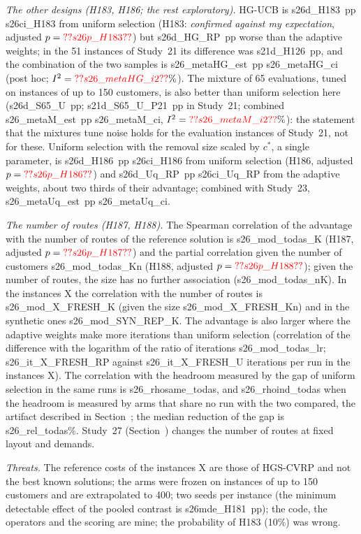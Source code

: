 \emph{The other designs (H183, H186; the rest exploratory).} HG-UCB is \num{s26d_H183}~pp \num{s26ci_H183} from uniform selection (H183: \emph{confirmed against my expectation}, adjusted $p=\num{s26p_H183}$) but \num{s26d_HG_RP}~pp worse than the adaptive weights; in the 51 instances of Study~21 its difference was \num{s21d_H126}~pp, and the combination of the two samples is \num{s26_metaHG_est}~pp \num{s26_metaHG_ci} (post hoc; $I^2=\num{s26_metaHG_i2}\%$). The mixture of 65 evaluations, tuned on instances of up to 150 customers, is also better than uniform selection here (\num{s26d_S65_U}~pp; \num{s21d_S65_U_P21}~pp in Study~21; combined \num{s26_metaM_est}~pp \num{s26_metaM_ci}, $I^2=\num{s26_metaM_i2}\%$): the statement that the mixtures tune noise holds for the evaluation instances of Study~21, not for these. Uniform selection with the removal size scaled by $c^*$, a single parameter, is \num{s26d_H186}~pp \num{s26ci_H186} from uniform selection (H186, adjusted $p=\num{s26p_H186}$) and \num{s26d_Uq_RP}~pp \num{s26ci_Uq_RP} from the adaptive weights, about two thirds of their advantage; combined with Study~23, \num{s26_metaUq_est}~pp \num{s26_metaUq_ci}.

\emph{The number of routes (H187, H188).} The Spearman correlation of the advantage with the number of routes of the reference solution is \num{s26_mod_todas_K} (H187, adjusted $p=\num{s26p_H187}$) and the partial correlation given the number of customers \num{s26_mod_todas_Kn} (H188, adjusted $p=\num{s26p_H188}$); given the number of routes, the size has no further association (\num{s26_mod_todas_nK}). In the instances X the correlation with the number of routes is \num{s26_mod_X_FRESH_K} (given the size \num{s26_mod_X_FRESH_Kn}) and in the synthetic ones \num{s26_mod_SYN_REP_K}. The advantage is also larger where the adaptive weights make more iterations than uniform selection (correlation of the difference with the logarithm of the ratio of iterations \num{s26_mod_todas_lr}; \num{s26_it_X_FRESH_RP} against \num{s26_it_X_FRESH_U} iterations per run in the instances X). The correlation with the headroom measured by the gap of uniform selection in the same runs is \num{s26_rhosame_todas}, and \num{s26_rhoind_todas} when the headroom is measured by arms that share no run with the two compared, the artifact described in Section~; the median reduction of the gap is \num{s26_rel_todas}\%. Study~27 (Section~) changes the number of routes at fixed layout and demands.

\emph{Threats.} The reference costs of the instances X are those of HGS-CVRP and not the best known solutions; the arms were frozen on instances of up to 150 customers and are extrapolated to 400; two seeds per instance (the minimum detectable effect of the pooled contrast is \num{s26mde_H181}~pp); the code, the operators and the scoring are mine; the probability of H183 (10\%) was wrong.

